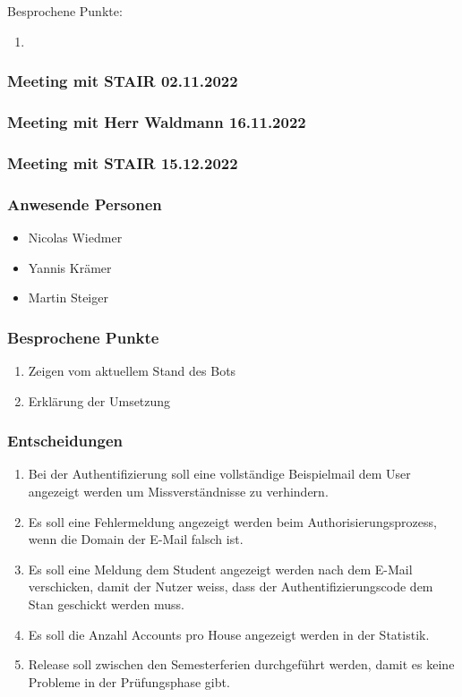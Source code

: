 \documentclass[a4paper, table]{article}
\begin{document}
Besprochene Punkte:

\begin{enumerate}
    \item 
\end{enumerate}

\subsubsection{Meeting mit STAIR 02.11.2022}

\subsubsection{Meeting mit Herr Waldmann 16.11.2022}


\newpage
\subsubsection{Meeting mit STAIR 15.12.2022}

\subsubsection*{Anwesende Personen}

\begin{itemize}
    \item Nicolas Wiedmer
    \item Yannis Krämer
    \item Martin Steiger
\end{itemize}

\subsubsection*{Besprochene Punkte}

\begin{enumerate}
    \item Zeigen vom aktuellem Stand des Bots
    \item Erklärung der Umsetzung
\end{enumerate}

\subsubsection*{Entscheidungen}

\begin{enumerate}
    \item Bei der Authentifizierung soll eine vollständige Beispielmail dem User angezeigt werden um Missverständnisse zu verhindern.
    \item Es soll eine Fehlermeldung angezeigt werden beim Authorisierungsprozess, wenn die Domain der E-Mail falsch ist.
    \item Es soll eine Meldung dem Student angezeigt werden nach dem E-Mail verschicken, damit der Nutzer weiss, dass der Authentifizierungscode dem Stan geschickt werden muss.
    \item Es soll die Anzahl Accounts pro House angezeigt werden in der Statistik.
    \item Release soll zwischen den Semesterferien durchgeführt werden, damit es keine Probleme in der Prüfungsphase gibt.
\end{enumerate}
\end{document}
